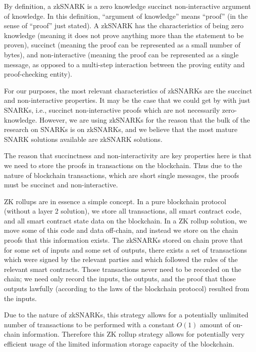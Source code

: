 \documentclass[12pt]{article}
\begin{document}
By definition, a zkSNARK is a zero knowledge succinct non-interactive argument of knowledge. In this definition, ``argument of knowledge'' means ``proof'' (in the sense of ``proof'' just stated). A zkSNARK has the characteristics of being zero knowledge (meaning it does not prove anything more than the statement to be proven), succinct (meaning the proof can be represented as a small number of bytes), and non-interactive (meaning the proof can be represented as a single message, as opposed to a multi-step interaction between the proving entity and proof-checking entity).

For our purposes, the most relevant characteristics of zkSNARKs are the succinct and non-interactive properties. It may be the case that we could get by with just SNARKs, i.e., succinct non-interactive proofs which are not necessarily zero-knowledge. However, we are using zkSNARKs for the reason that the bulk of the research on SNARKs is on zkSNARKs, and we believe that the most mature SNARK solutions available are zkSNARK solutions.

The reason that succinctness and non-interactivity are key properties here is that we need to store the proofs in transactions on the blockchain. Thus due to the nature of blockchain transactions, which are short single messages, the proofs must be succinct and non-interactive.

ZK rollups are in essence a simple concept. In a pure blockchain protocol (without a layer 2 solution), we store all transactions, all smart contract code, and all smart contract state data on the blockchain. In a ZK rollup solution, we move some of this code and data off-chain, and instead we store on the chain proofs that this information exists. The zkSNARKs stored on chain prove that for some set of inputs and some set of outputs, there exists a set of transactions which were signed by the relevant parties and which followed the rules of the relevant smart contracts. Those transactions never need to be recorded on the chain; we need only record the inputs, the outputs, and the proof that those outputs lawfully (according to the laws of the blockchain protocol) resulted from the inputs.

Due to the nature of zkSNARKs, this strategy allows for a potentially unlimited number of transactions to be performed with a constant $O(1)$ amount of on-chain information. Therefore this ZK rollup strategy allows for potentially very efficient usage of the limited information storage capacity of the blockchain. 
\end{document}
